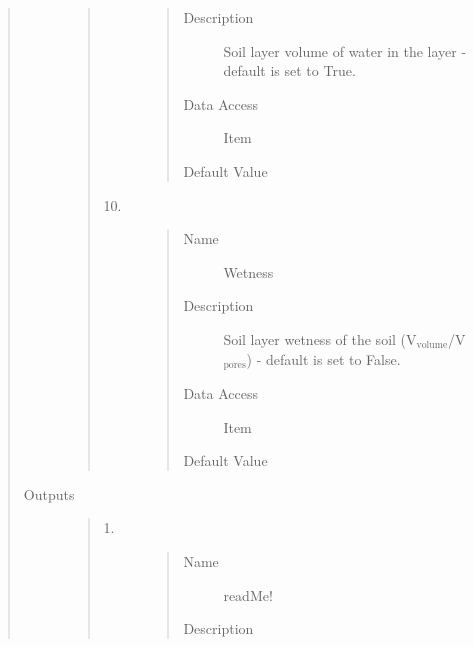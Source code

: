 \documentclass[letterpaper,10pt,english]{sphinxmanual}
\begin{document}
\begin{quote}
\begin{description}
\begin{quote}
\begin{description}
\begin{quote}
\begin{description}
\item[{Description}] \leavevmode
Soil layer volume of water in the layer - default is set to True.

\item[{Data Access}] \leavevmode
Item

\item[{Default Value}] \leavevmode
{}

\end{description}\end{quote}

\item[{10.}] \leavevmode\begin{quote}\begin{description}
\item[{Name}] \leavevmode
Wetness

\item[{Description}] \leavevmode
Soil layer wetness of the soil (V$_{\text{volume}}$/V$_{\text{pores}}$) - default is set to False.

\item[{Data Access}] \leavevmode
Item

\item[{Default Value}] \leavevmode
{}

\end{description}\end{quote}

\end{description}\end{quote}

\item[{Outputs}] \leavevmode\begin{quote}\begin{description}
\item[{1.}] \leavevmode\begin{quote}\begin{description}
\item[{Name}] \leavevmode
readMe!

\item[{Description}] \leavevmode
{}


\end{description}
\end{quote}
\end{description}
\end{quote}
\end{description}
\end{quote}
\end{document}
